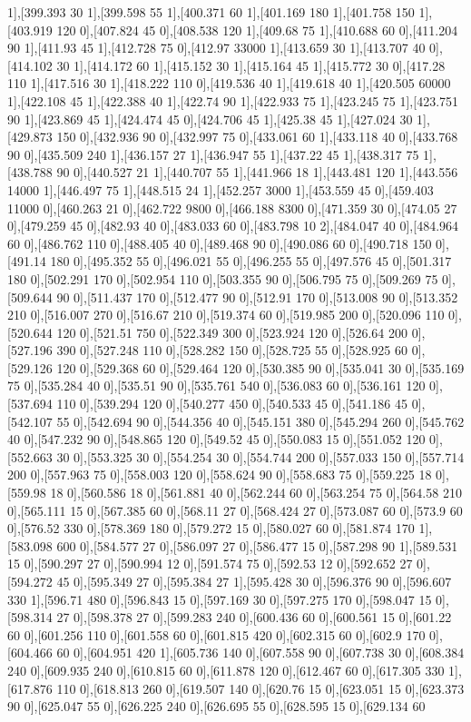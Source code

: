 {1],[399.393 30 1],[399.598 55 1],[400.371 60 1],[401.169 180 1],[401.758 150 1],[403.919 120 0],[407.824 45 0],[408.538 120 1],[409.68 75 1],[410.688 60 0],[411.204 90 1],[411.93 45 1],[412.728 75 0],[412.97 33000 1],[413.659 30 1],[413.707 40 0],[414.102 30 1],[414.172 60 1],[415.152 30 1],[415.164 45 1],[415.772 30 0],[417.28 110 1],[417.516 30 1],[418.222 110 0],[419.536 40 1],[419.618 40 1],[420.505 60000 1],[422.108 45 1],[422.388 40 1],[422.74 90 1],[422.933 75 1],[423.245 75 1],[423.751 90 1],[423.869 45 1],[424.474 45 0],[424.706 45 1],[425.38 45 1],[427.024 30 1],[429.873 150 0],[432.936 90 0],[432.997 75 0],[433.061 60 1],[433.118 40 0],[433.768 90 0],[435.509 240 1],[436.157 27 1],[436.947 55 1],[437.22 45 1],[438.317 75 1],[438.788 90 0],[440.527 21 1],[440.707 55 1],[441.966 18 1],[443.481 120 1],[443.556 14000 1],[446.497 75 1],[448.515 24 1],[452.257 3000 1],[453.559 45 0],[459.403 11000 0],[460.263 21 0],[462.722 9800 0],[466.188 8300 0],[471.359 30 0],[474.05 27 0],[479.259 45 0],[482.93 40 0],[483.033 60 0],[483.798 10 2],[484.047 40 0],[484.964 60 0],[486.762 110 0],[488.405 40 0],[489.468 90 0],[490.086 60 0],[490.718 150 0],[491.14 180 0],[495.352 55 0],[496.021 55 0],[496.255 55 0],[497.576 45 0],[501.317 180 0],[502.291 170 0],[502.954 110 0],[503.355 90 0],[506.795 75 0],[509.269 75 0],[509.644 90 0],[511.437 170 0],[512.477 90 0],[512.91 170 0],[513.008 90 0],[513.352 210 0],[516.007 270 0],[516.67 210 0],[519.374 60 0],[519.985 200 0],[520.096 110 0],[520.644 120 0],[521.51 750 0],[522.349 300 0],[523.924 120 0],[526.64 200 0],[527.196 390 0],[527.248 110 0],[528.282 150 0],[528.725 55 0],[528.925 60 0],[529.126 120 0],[529.368 60 0],[529.464 120 0],[530.385 90 0],[535.041 30 0],[535.169 75 0],[535.284 40 0],[535.51 90 0],[535.761 540 0],[536.083 60 0],[536.161 120 0],[537.694 110 0],[539.294 120 0],[540.277 450 0],[540.533 45 0],[541.186 45 0],[542.107 55 0],[542.694 90 0],[544.356 40 0],[545.151 380 0],[545.294 260 0],[545.762 40 0],[547.232 90 0],[548.865 120 0],[549.52 45 0],[550.083 15 0],[551.052 120 0],[552.663 30 0],[553.325 30 0],[554.254 30 0],[554.744 200 0],[557.033 150 0],[557.714 200 0],[557.963 75 0],[558.003 120 0],[558.624 90 0],[558.683 75 0],[559.225 18 0],[559.98 18 0],[560.586 18 0],[561.881 40 0],[562.244 60 0],[563.254 75 0],[564.58 210 0],[565.111 15 0],[567.385 60 0],[568.11 27 0],[568.424 27 0],[573.087 60 0],[573.9 60 0],[576.52 330 0],[578.369 180 0],[579.272 15 0],[580.027 60 0],[581.874 170 1],[583.098 600 0],[584.577 27 0],[586.097 27 0],[586.477 15 0],[587.298 90 1],[589.531 15 0],[590.297 27 0],[590.994 12 0],[591.574 75 0],[592.53 12 0],[592.652 27 0],[594.272 45 0],[595.349 27 0],[595.384 27 1],[595.428 30 0],[596.376 90 0],[596.607 330 1],[596.71 480 0],[596.843 15 0],[597.169 30 0],[597.275 170 0],[598.047 15 0],[598.314 27 0],[598.378 27 0],[599.283 240 0],[600.436 60 0],[600.561 15 0],[601.22 60 0],[601.256 110 0],[601.558 60 0],[601.815 420 0],[602.315 60 0],[602.9 170 0],[604.466 60 0],[604.951 420 1],[605.736 140 0],[607.558 90 0],[607.738 30 0],[608.384 240 0],[609.935 240 0],[610.815 60 0],[611.878 120 0],[612.467 60 0],[617.305 330 1],[617.876 110 0],[618.813 260 0],[619.507 140 0],[620.76 15 0],[623.051 15 0],[623.373 90 0],[625.047 55 0],[626.225 240 0],[626.695 55 0],[628.595 15 0],[629.134 60 }
